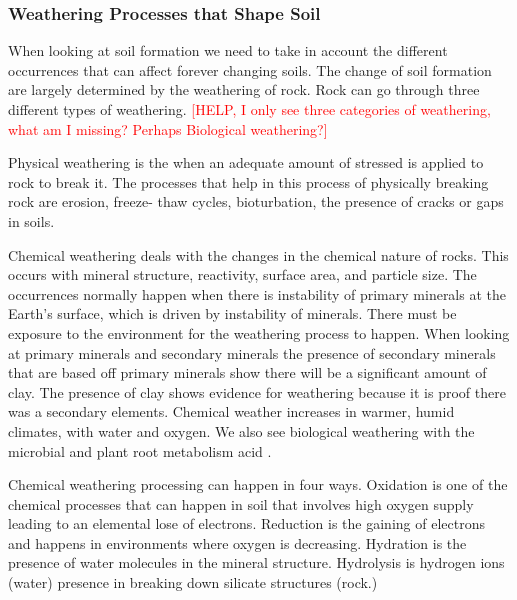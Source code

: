 
\subsubsection{Weathering Processes that Shape Soil}

When looking at soil formation we need to take in account the different occurrences that can affect forever changing soils. The change of soil formation are largely determined by the weathering of rock. Rock can go through three different types of weathering. \textcolor{red}{[HELP, I only see three categories of weathering, what am I missing? Perhaps Biological weathering?]}

Physical weathering is the when an adequate amount of stressed is applied to rock to break it. The processes that help in this process of physically breaking rock are erosion, freeze- thaw cycles, bioturbation, the presence of cracks or gaps in soils. 

Chemical weathering deals with the changes in the chemical nature of rocks. This occurs with mineral structure, reactivity, surface area, and particle size. The occurrences normally happen when there is instability of primary minerals at the Earth's surface, which is driven by instability of minerals. There must be exposure to the environment for the weathering process to happen. When looking at primary minerals and secondary minerals the presence of secondary minerals that are based off primary minerals show there will be a significant amount of clay. The presence of clay shows evidence for weathering because it is proof there was a secondary elements. Chemical weather increases in warmer, humid climates, with water and oxygen. We also see biological weathering with the microbial and plant root metabolism acid \citep{brady2007colloidal}. 

Chemical weathering processing can happen in four ways. Oxidation is one of the chemical processes that can happen in soil that involves high oxygen supply leading to an elemental lose of electrons. Reduction is the gaining of electrons and happens in environments where oxygen is decreasing. Hydration is the presence of water molecules in the mineral structure. Hydrolysis is hydrogen ions (water) presence in breaking down silicate structures (rock.)

